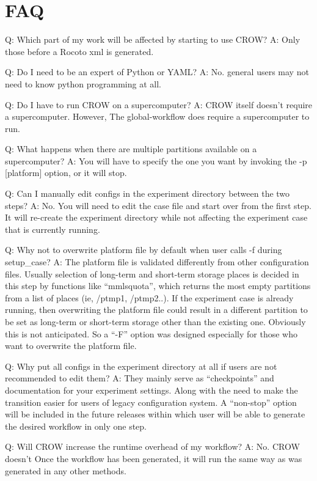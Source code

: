 \section*{F\-A\-Q }

Q\-: Which part of my work will be affected by starting to use C\-R\-O\-W? A\-: Only those before a Rocoto xml is generated.

Q\-: Do I need to be an expert of Python or Y\-A\-M\-L? A\-: No. general users may not need to know python programming at all.

Q\-: Do I have to run C\-R\-O\-W on a supercomputer? A\-: C\-R\-O\-W itself doesn’t require a supercomputer. However, The global-\/workflow does require a supercomputer to run.

Q\-: What happens when there are multiple partitions available on a supercomputer? A\-: You will have to specify the one you want by invoking the -\/p \mbox{[}platform\mbox{]} option, or it will stop.

Q\-: Can I manually edit configs in the experiment directory between the two steps? A\-: No. You will need to edit the case file and start over from the first step. It will re-\/create the experiment directory while not affecting the experiment case that is currently running.

Q\-: Why not to overwrite platform file by default when user calls -\/f during setup\-\_\-case? A\-: The platform file is validated differently from other configuration files. Usually selection of long-\/term and short-\/term storage places is decided in this step by functions like “mmlsquota”, which returns the most empty partitions from a list of places (ie, /ptmp1, /ptmp2..). If the experiment case is already running, then overwriting the platform file could result in a different partition to be set as long-\/term or short-\/term storage other than the existing one. Obviously this is not anticipated. So a “-\/\-F” option was designed especially for those who want to overwrite the platform file.

Q\-: Why put all configs in the experiment directory at all if users are not recommended to edit them? A\-: They mainly serve as “checkpoints” and documentation for your experiment settings. Along with the need to make the transition easier for users of legacy configuration system. A “non-\/stop” option will be included in the future releases within which user will be able to generate the desired workflow in only one step.

Q\-: Will C\-R\-O\-W increase the runtime overhead of my workflow? A\-: No. C\-R\-O\-W doesn’t Once the workflow has been generated, it will run the same way as was generated in any other methods.

